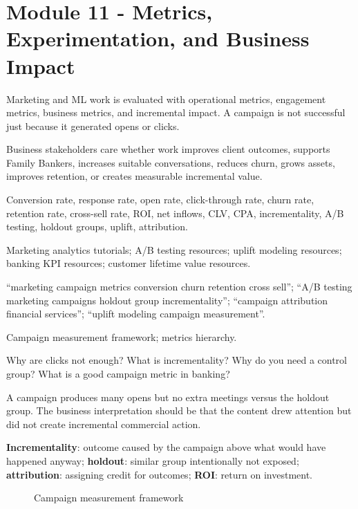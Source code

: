 \documentclass[
	11pt,
	fleqn,
	a4paper,
	oneside,
]{LegrandOrangeBook}
\newcommand{\moduleblock}[9]{%
	\begin{description}[leftmargin=3.4cm, style=nextline, font=\sffamily\bfseries]
		\item[What it is] #1
		\item[Why it matters] #2
		\item[Key concepts] #3
		\item[Resources to find] #4
		\item[Search queries] #5
		\item[Diagrams] #6
		\item[Practical questions] #7
		\item[Mini case] #8
		\item[Key terms] #9
	\end{description}
}
\newcommand{\term}[2]{\textbf{#1}: #2}
\begin{document}
\section{Module 11 - Metrics, Experimentation, and Business Impact}

\moduleblock
{Marketing and ML work is evaluated with operational metrics, engagement metrics, business metrics, and incremental impact. A campaign is not successful just because it generated opens or clicks.}
{Business stakeholders care whether work improves client outcomes, supports Family Bankers, increases suitable conversations, reduces churn, grows assets, improves retention, or creates measurable incremental value.}
{Conversion rate, response rate, open rate, click-through rate, churn rate, retention rate, cross-sell rate, ROI, net inflows, CLV, CPA, incrementality, A/B testing, holdout groups, uplift, attribution.}
{Marketing analytics tutorials; A/B testing resources; uplift modeling resources; banking KPI resources; customer lifetime value resources.}
{``marketing campaign metrics conversion churn retention cross sell''; ``A/B testing marketing campaigns holdout group incrementality''; ``campaign attribution financial services''; ``uplift modeling campaign measurement''.}
{Campaign measurement framework; metrics hierarchy.}
{Why are clicks not enough? What is incrementality? Why do you need a control group? What is a good campaign metric in banking?}
{A campaign produces many opens but no extra meetings versus the holdout group. The business interpretation should be that the content drew attention but did not create incremental commercial action.}
{\term{Incrementality}{outcome caused by the campaign above what would have happened anyway}; \term{holdout}{similar group intentionally not exposed}; \term{attribution}{assigning credit for outcomes}; \term{ROI}{return on investment}.}

\begin{figure}[H]
	\centering
	\caption{Campaign measurement framework}
\end{figure}
\end{document}
